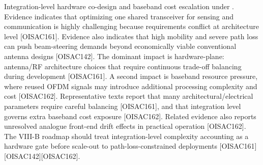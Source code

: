 \markdownRendererOlEnd \markdownRendererInterblockSeparator
{}
\markdownRendererSectionEnd \markdownRendererSectionBegin
{}\markdownRendererInterblockSeparator
{}\markdownRendererOlBegin
{} Integration-level hardware co-design and baseband cost escalation under .\markdownRendererOlItemEnd 
{} Evidence indicates that optimizing one shared transceiver for sensing and communication is highly challenging because requirements conflict at architecture level [O\markdownRendererUnderscore{}ISAC\markdownRendererUnderscore{}161]. Evidence also indicates that high mobility and severe path loss can push beam-steering demands beyond economically viable conventional antenna designs [O\markdownRendererUnderscore{}ISAC\markdownRendererUnderscore{}142].\markdownRendererOlItemEnd 
{} The dominant impact is hardware-plane: antenna/RF architecture choices that require continuous trade-off balancing during development [O\markdownRendererUnderscore{}ISAC\markdownRendererUnderscore{}161]. A second impact is baseband resource pressure, where reused OFDM signals may introduce additional processing complexity and cost [O\markdownRendererUnderscore{}ISAC\markdownRendererUnderscore{}162].\markdownRendererOlItemEnd 
{} Representative texts report that many architectural/electrical parameters require careful balancing [O\markdownRendererUnderscore{}ISAC\markdownRendererUnderscore{}161], and that integration level governs extra baseband cost exposure [O\markdownRendererUnderscore{}ISAC\markdownRendererUnderscore{}162]. Related evidence also reports unresolved analogue front-end drift effects in practical operation [O\markdownRendererUnderscore{}ISAC\markdownRendererUnderscore{}162].\markdownRendererOlItemEnd 
{} The VIII-B roadmap should treat integration-level complexity accounting as a hardware gate before scale-out to path-loss-constrained deployments [O\markdownRendererUnderscore{}ISAC\markdownRendererUnderscore{}161][O\markdownRendererUnderscore{}ISAC\markdownRendererUnderscore{}142][O\markdownRendererUnderscore{}ISAC\markdownRendererUnderscore{}162].\markdownRendererOlItemEnd 
